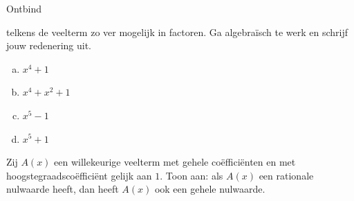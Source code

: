 \documentclass{ximera}
\begin{document}
\begin{exercise} 
\hypertarget{oef4.11}{Ontbind} telkens de veelterm zo ver mogelijk in factoren. Ga algebra\"isch te werk en schrijf jouw redenering uit.  
\begin{multicols}{2}
\begin{enumerate}[(a)]
\item
$x^4+1$
\item
$x^4 + x^2 + 1$
\item
$x^5-1$
\item
$x^5+1$
\end{enumerate}
\end{multicols}
\end{exercise} 

\begin{exercise} 
Zij $A(x)$ een willekeurige veelterm met gehele co\"effici\"enten en met hoogstegraadsco\"effici\"ent gelijk aan $1$. Toon aan: als $A(x)$ een rationale nulwaarde heeft, dan heeft $A(x)$ ook een gehele nulwaarde.
\end{exercise} 
\end{document}
